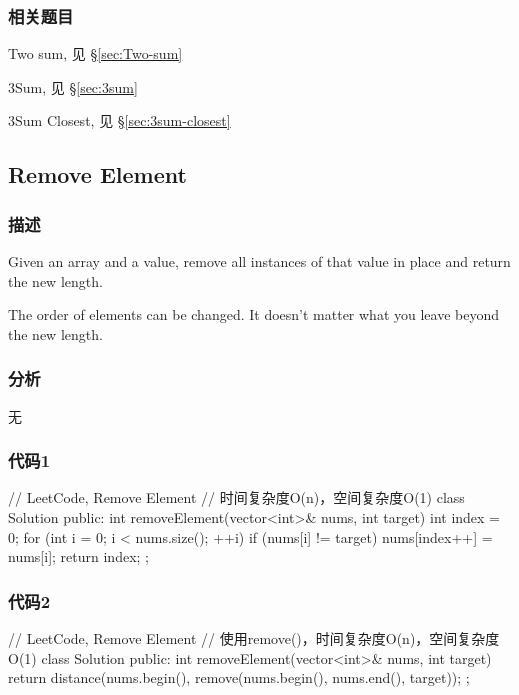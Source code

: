 \subsubsection{相关题目}
\begindot
\item Two sum, 见 \S \ref{sec:Two-sum}
\item 3Sum, 见 \S \ref{sec:3sum}
\item 3Sum Closest, 见 \S \ref{sec:3sum-closest}
\myenddot


\subsection{Remove Element} %
\label{sec:remove-element }


\subsubsection{描述}
Given an array and a value, remove all instances of that value in place and return the new length.

The order of elements can be changed. It doesn't matter what you leave beyond the new length.


\subsubsection{分析}
无


\subsubsection{代码1}
\begin{Code}
// LeetCode, Remove Element
// 时间复杂度O(n)，空间复杂度O(1)
class Solution {
public:
    int removeElement(vector<int>& nums, int target) {
        int index = 0;
        for (int i = 0; i < nums.size(); ++i) {
            if (nums[i] != target) {
                nums[index++] = nums[i];
            }
        }
        return index;
    }
};
\end{Code}


\subsubsection{代码2}
\begin{Code}
// LeetCode, Remove Element
// 使用remove()，时间复杂度O(n)，空间复杂度O(1)
class Solution {
public:
    int removeElement(vector<int>& nums, int target) {
        return distance(nums.begin(), remove(nums.begin(), nums.end(), target));
    }
};
\end{Code}


